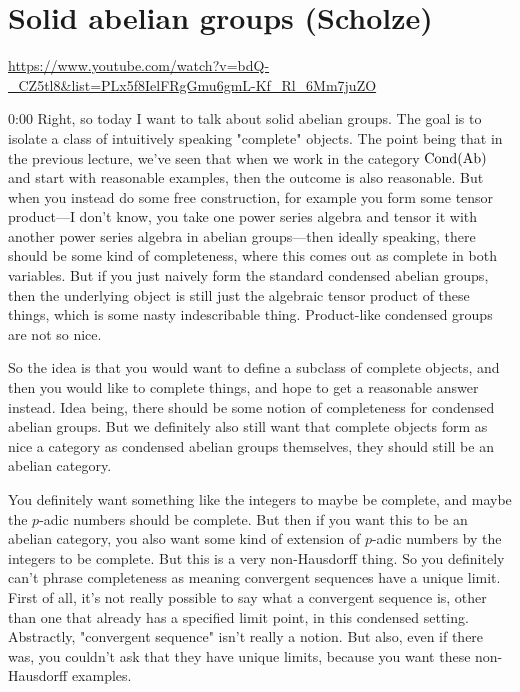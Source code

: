 
\section{\ufs Solid abelian groups (Scholze)}

\url{https://www.youtube.com/watch?v=bdQ-_CZ5tl8&list=PLx5f8IelFRgGmu6gmL-Kf_Rl_6Mm7juZO}
\renewcommand{\yt}[2]{\href{https://www.youtube.com/watch?v=bdQ-_CZ5tl8&list=PLx5f8IelFRgGmu6gmL-Kf_Rl_6Mm7juZO&t=#1}{#2}}
\vspace{1em}

\begin{unfinished}{0:00}
  Right, so today I want to talk about solid abelian groups. The goal is to isolate a class of intuitively speaking "complete" objects. The point being that in the previous lecture, we've seen that when we work in the category $\mathrm{Cond}(\mathrm{Ab})$ and start with reasonable examples, then the outcome is also reasonable. But when you instead do some free construction, for example you form some tensor product---I don't know, you take one power series algebra and tensor it with another power series algebra in abelian groups---then ideally speaking, there should be some kind of completeness, where this comes out as complete in both variables. But if you just naively form the standard condensed abelian groups, then the underlying object is still just the algebraic tensor product of these things, which is some nasty indescribable thing. Product-like condensed groups are not so nice.

So the idea is that you would want to define a subclass of complete objects, and then you would like to complete things, and hope to get a reasonable answer instead. Idea being, there should be some notion of completeness for condensed abelian groups. But we definitely also still want that complete objects form as nice a category as condensed abelian groups themselves, they should still be an abelian category.

You definitely want something like the integers to maybe be complete, and maybe the $p$-adic numbers should be complete. But then if you want this to be an abelian category, you also want some kind of extension of $p$-adic numbers by the integers to be complete. But this is a very non-Hausdorff thing. So you definitely can't phrase completeness as meaning convergent sequences have a unique limit. First of all, it's not really possible to say what a convergent sequence is, other than one that already has a specified limit point, in this condensed setting. Abstractly, "convergent sequence" isn't really a notion. But also, even if there was, you couldn't ask that they have unique limits, because you want these non-Hausdorff examples.


\end{unfinished}
